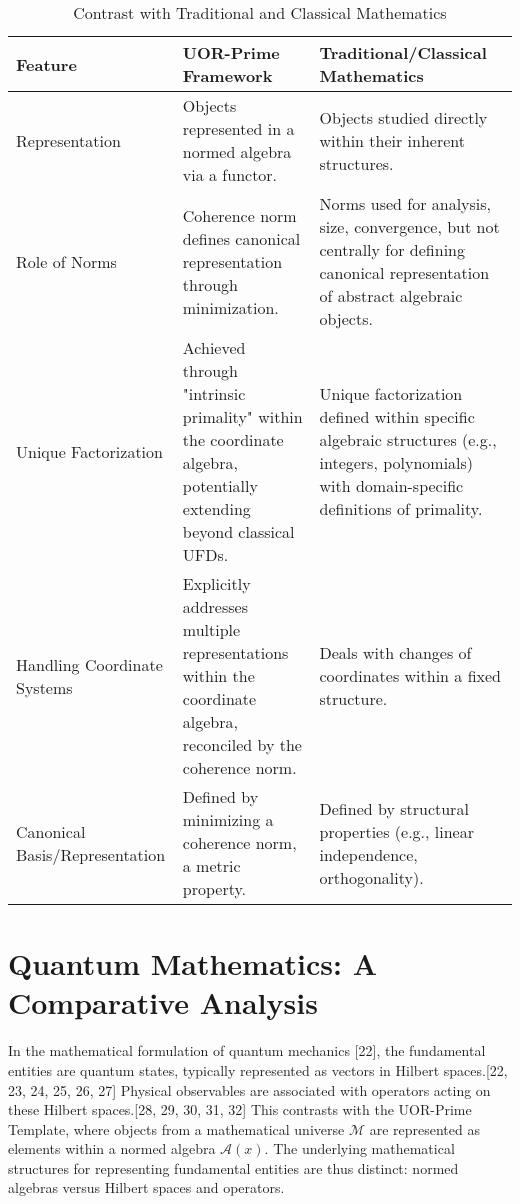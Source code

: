 \documentclass{article}
\begin{document}
\begin{table}[h!]
    \centering
    \begin{tabular}{|l|l|l|}
        \hline
        Feature & UOR-Prime Framework & Traditional/Classical Mathematics \\
        \hline
        Representation & Objects represented in a normed algebra via a functor. & Objects studied directly within their inherent structures. \\
        \hline
        Role of Norms & Coherence norm defines canonical representation through minimization. & Norms used for analysis, size, convergence, but not centrally for defining canonical representation of abstract algebraic objects. \\
        \hline
        Unique Factorization & Achieved through "intrinsic primality" within the coordinate algebra, potentially extending beyond classical UFDs. & Unique factorization defined within specific algebraic structures (e.g., integers, polynomials) with domain-specific definitions of primality. \\
        \hline
        Handling Coordinate Systems & Explicitly addresses multiple representations within the coordinate algebra, reconciled by the coherence norm. & Deals with changes of coordinates within a fixed structure. \\
        \hline
        Canonical Basis/Representation & Defined by minimizing a coherence norm, a metric property. & Defined by structural properties (e.g., linear independence, orthogonality). \\
        \hline
    \end{tabular}
    \caption{Contrast with Traditional and Classical Mathematics}
    \label{tab:contrast_classical}
\end{table}

\section{Quantum Mathematics: A Comparative Analysis}

In the mathematical formulation of quantum mechanics [22], the fundamental entities are quantum states, typically represented as vectors in Hilbert spaces.[22, 23, 24, 25, 26, 27] Physical observables are associated with operators acting on these Hilbert spaces.[28, 29, 30, 31, 32] This contrasts with the UOR-Prime Template, where objects from a mathematical universe $\mathcal{M}$ are represented as elements within a normed algebra $\mathcal{A}(x)$. The underlying mathematical structures for representing fundamental entities are thus distinct: normed algebras versus Hilbert spaces and operators.
\end{document}
